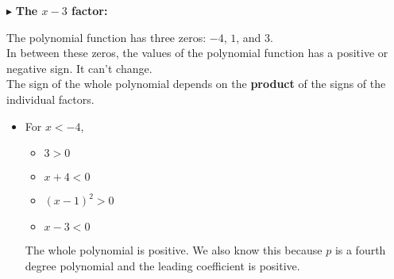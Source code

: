 \documentclass{ximera}
\begin{document}
\begin{example}
$\blacktriangleright$ \textbf{The $x-3$ factor:}

\begin{image}
  \end{image}


The polynomial function has three zeros: $-4$, $1$, and $3$. \\

In between these zeros, the values of the polynomial function has a positive or negative sign. It can't change. \\

The sign of the whole polynomial depends on the \textbf{\textcolor{purple!85!blue}{product}} of the signs of the individual factors.



\begin{itemize}
\item For $x < -4$, 
\begin{itemize}
  \item $3 > 0$
  \item $x+4 < 0$
  \item $(x-1)^2 > 0$
  \item $x-3 < 0$ 
\end{itemize}
The whole polynomial is positive. We also know this because $p$ is a fourth degree polynomial and the leading coefficient is positive.



\end{itemize}
\end{example}
\end{document}

